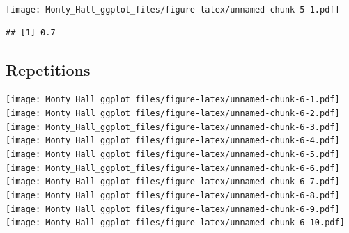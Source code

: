 \documentclass[
]{article}
\newenvironment{Shaded}{\begin{snugshade}}{\end{snugshade}}
\newcommand{\CommentTok}[1]{\textcolor[rgb]{0.56,0.35,0.01}{\textit{#1}}}
\newcommand{\ControlFlowTok}[1]{\textcolor[rgb]{0.13,0.29,0.53}{\textbf{#1}}}
\newcommand{\DecValTok}[1]{\textcolor[rgb]{0.00,0.00,0.81}{#1}}
\newcommand{\KeywordTok}[1]{\textcolor[rgb]{0.13,0.29,0.53}{\textbf{#1}}}
\newcommand{\NormalTok}[1]{#1}
\newcommand{\OperatorTok}[1]{\textcolor[rgb]{0.81,0.36,0.00}{\textbf{#1}}}
\newcommand{\StringTok}[1]{\textcolor[rgb]{0.31,0.60,0.02}{#1}}
\begin{document}
\texttt{[image: Monty\_Hall\_ggplot\_files/figure-latex/unnamed-chunk-5-1.pdf]}

\begin{Shaded}
\end{Shaded}

\begin{verbatim}
## [1] 0.7
\end{verbatim}

\hypertarget{repetitions}{%
\subsection{Repetitions}\label{repetitions}}

\begin{Shaded}
\end{Shaded}

\texttt{[image: Monty\_Hall\_ggplot\_files/figure-latex/unnamed-chunk-6-1.pdf]}
\texttt{[image: Monty\_Hall\_ggplot\_files/figure-latex/unnamed-chunk-6-2.pdf]}
\texttt{[image: Monty\_Hall\_ggplot\_files/figure-latex/unnamed-chunk-6-3.pdf]}
\texttt{[image: Monty\_Hall\_ggplot\_files/figure-latex/unnamed-chunk-6-4.pdf]}
\texttt{[image: Monty\_Hall\_ggplot\_files/figure-latex/unnamed-chunk-6-5.pdf]}
\texttt{[image: Monty\_Hall\_ggplot\_files/figure-latex/unnamed-chunk-6-6.pdf]}
\texttt{[image: Monty\_Hall\_ggplot\_files/figure-latex/unnamed-chunk-6-7.pdf]}
\texttt{[image: Monty\_Hall\_ggplot\_files/figure-latex/unnamed-chunk-6-8.pdf]}
\texttt{[image: Monty\_Hall\_ggplot\_files/figure-latex/unnamed-chunk-6-9.pdf]}
\texttt{[image: Monty\_Hall\_ggplot\_files/figure-latex/unnamed-chunk-6-10.pdf]}
\end{document}
